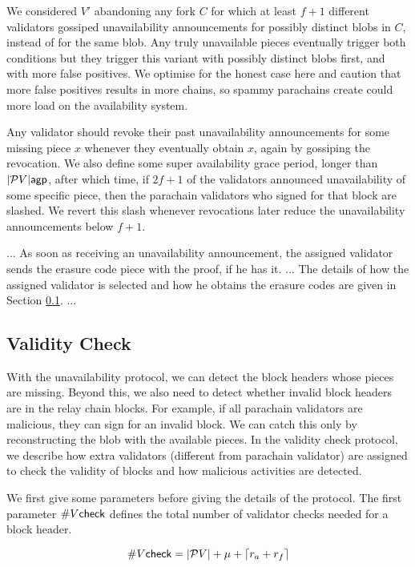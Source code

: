 We considered $V'$ abandoning any fork $C$ for which at least $f+1$ different validators gossiped unavailability announcements for possibly distinct blobs in $C$, instead of for the same blob.  Any truly unavailable pieces eventually trigger both conditions but they trigger this variant with possibly distinct blobs first, and with more false positives.  We optimise for the honest case here and caution that more false positives results in more chains, so spammy parachains create could more load on the availability system.

Any validator should revoke their past unavailability announcements for some missing piece $x$ whenever they eventually obtain $x$, again by gossiping the revocation.  We also define some super availability grace period, longer than $|\mathcal{P}V| \mathsf{agp}$, after which time, if $2 f + 1$ of the validators announced unavailability of some specific piece, then the parachain validators who signed for that block are slashed.
We revert this slash whenever revocations later reduce the unavailability announcements below $f+1$.

...
As soon as receiving an unavailability announcement, the assigned validator sends the erasure code piece with the proof, if he has it. 
...
The details of how the assigned validator is selected and how he obtains the erasure codes are given in Section \ref{sec:validitycheck}. 
...



\subsection{Validity Check}
\label{sec:validitycheck}
With the unavailability protocol, we can detect the block headers whose pieces are missing. Beyond this, we also need to detect whether invalid block headers are in the relay chain blocks. For example, if all parachain validators are malicious, they can sign for an invalid block. We can catch this only by reconstructing the blob with the available pieces. In the validity check protocol, we describe how extra validators (different from parachain validator) are assigned to check the validity of blocks and how malicious activities are detected.


We first give some parameters before giving the details of the protocol.
The first parameter $\#V\mathsf{check}$ defines the total number of validator checks needed for a block header.

$$\#V\mathsf{check} = |\mathcal{P}V| + \mu +\lceil r_{a} + r_{f} \rceil$$

